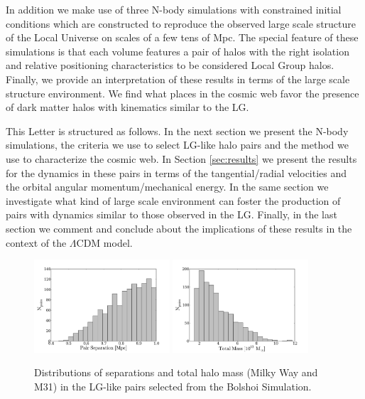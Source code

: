 \documentclass{emulateapj}
\begin{document}
In addition we make use of three N-body simulations with constrained initial conditions which are constructed to reproduce the observed large scale structure of the Local Universe on scales of a few tens of Mpc. The special feature of these simulations is that each volume features a pair of halos with the right isolation and relative positioning characteristics to be considered Local Group halos.  Finally, we provide an interpretation of these results in terms of the large scale structure environment. We find what places in the cosmic web favor the presence of dark matter halos with kinematics similar to the LG.

This Letter is structured as follows. In the next section we present the N-body simulations, the criteria we use to select LG-like halo pairs and the method we use to characterize the cosmic web. In Section \ref{sec:results} we present the results for the dynamics in these pairs in terms of the tangential/radial velocities and the orbital angular momentum/mechanical energy. In the same section we investigate what kind of large scale environment can foster the production of pairs with dynamics similar to those observed in the LG. Finally, in the last section we comment and conclude about the implications of these results in the context of the $\Lambda$CDM model.





\label{subsec:lg-sample}
\begin{figure}
\begin{center}
\includegraphics[keepaspectratio=true,width=0.45\textwidth]{./figures/separation.pdf}
\includegraphics[keepaspectratio=true,width=0.45\textwidth]{./figures/total_mass.pdf}
\caption{\label{fig:distros} Distributions of separations and total halo mass (Milky Way and M31) in the LG-like pairs selected from the Bolshoi Simulation.}
\end{center}
\end{figure}
\end{document}
